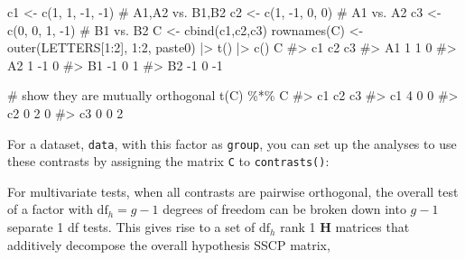 \documentclass[
  letterpaper,
  10pt,
  krantz2]{krantz}
\makeatletter
\newenvironment{Shaded}{\begin{snugshade}}{\end{snugshade}}
\newcommand{\CommentTok}[1]{\textcolor[rgb]{0.37,0.37,0.37}{#1}}
\newcommand{\DecValTok}[1]{\textcolor[rgb]{0.68,0.00,0.00}{#1}}
\newcommand{\FunctionTok}[1]{\textcolor[rgb]{0.28,0.35,0.67}{#1}}
\newcommand{\NormalTok}[1]{\textcolor[rgb]{0.00,0.23,0.31}{#1}}
\newcommand{\OtherTok}[1]{\textcolor[rgb]{0.00,0.23,0.31}{#1}}
\newcommand{\SpecialCharTok}[1]{\textcolor[rgb]{0.37,0.37,0.37}{#1}}
\newenvironment{kframe}{%
  \medskip{}
  \setlength{\fboxsep}{.8em}
  \def\at@end@of@kframe{}%
  \ifinner\ifhmode%
  \def\at@end@of@kframe{\end{minipage}}%
  \begin{minipage}{\columnwidth}%
  \fi\fi%
  \def\FrameCommand##1{\hskip\@totalleftmargin \hskip-\fboxsep
  \colorbox{shadecolor}{##1}\hskip-\fboxsep
      \hskip-\linewidth \hskip-\@totalleftmargin \hskip\columnwidth}%
  \MakeFramed {\advance\hsize-\width
    \@totalleftmargin\z@ \linewidth\hsize
    \@setminipage}}%
{\par\unskip\endMakeFramed%
  \at@end@of@kframe}
\renewenvironment{Shaded}{\begin{kframe}}{\end{kframe}}
\makeatother
\begin{document}
\begin{Shaded}
\begin{Highlighting}[]
\NormalTok{c1 }\OtherTok{\textless{}{-}} \FunctionTok{c}\NormalTok{(}\DecValTok{1}\NormalTok{,  }\DecValTok{1}\NormalTok{, }\SpecialCharTok{{-}}\DecValTok{1}\NormalTok{, }\SpecialCharTok{{-}}\DecValTok{1}\NormalTok{)    }\CommentTok{\# A1,A2 vs. B1,B2}
\NormalTok{c2 }\OtherTok{\textless{}{-}} \FunctionTok{c}\NormalTok{(}\DecValTok{1}\NormalTok{, }\SpecialCharTok{{-}}\DecValTok{1}\NormalTok{,  }\DecValTok{0}\NormalTok{,  }\DecValTok{0}\NormalTok{)    }\CommentTok{\# A1 vs. A2}
\NormalTok{c3 }\OtherTok{\textless{}{-}} \FunctionTok{c}\NormalTok{(}\DecValTok{0}\NormalTok{,  }\DecValTok{0}\NormalTok{,  }\DecValTok{1}\NormalTok{, }\SpecialCharTok{{-}}\DecValTok{1}\NormalTok{)    }\CommentTok{\# B1 vs. B2}
\NormalTok{C }\OtherTok{\textless{}{-}} \FunctionTok{cbind}\NormalTok{(c1,c2,c3) }
\FunctionTok{rownames}\NormalTok{(C) }\OtherTok{\textless{}{-}} \FunctionTok{outer}\NormalTok{(LETTERS[}\DecValTok{1}\SpecialCharTok{:}\DecValTok{2}\NormalTok{], }\DecValTok{1}\SpecialCharTok{:}\DecValTok{2}\NormalTok{, paste0) }\SpecialCharTok{|\textgreater{}} 
  \FunctionTok{t}\NormalTok{() }\SpecialCharTok{|\textgreater{}} 
  \FunctionTok{c}\NormalTok{()}
\NormalTok{C}
\CommentTok{\#\textgreater{}    c1 c2 c3}
\CommentTok{\#\textgreater{} A1  1  1  0}
\CommentTok{\#\textgreater{} A2  1 {-}1  0}
\CommentTok{\#\textgreater{} B1 {-}1  0  1}
\CommentTok{\#\textgreater{} B2 {-}1  0 {-}1}

\CommentTok{\# show they are mutually orthogonal}
\FunctionTok{t}\NormalTok{(C) }\SpecialCharTok{\%*\%}\NormalTok{ C}
\CommentTok{\#\textgreater{}    c1 c2 c3}
\CommentTok{\#\textgreater{} c1  4  0  0}
\CommentTok{\#\textgreater{} c2  0  2  0}
\CommentTok{\#\textgreater{} c3  0  0  2}
\end{Highlighting}
\end{Shaded}

For a dataset, \texttt{data}, with this factor as \texttt{group}, you
can set up the analyses to use these contrasts by assigning the matrix
\texttt{C} to \texttt{contrasts()}:

\begin{Shaded}
\end{Shaded}

For multivariate tests, when all contrasts are pairwise orthogonal, the
overall test of a factor with \(\text{df}_h = g-1\) degrees of freedom
can be broken down into \(g-1\) separate 1 df tests. This gives rise to
a set of \(\text{df}_h\) rank 1 \(\mathbf{H}\) matrices that additively
decompose the overall hypothesis SSCP matrix,
\end{document}
